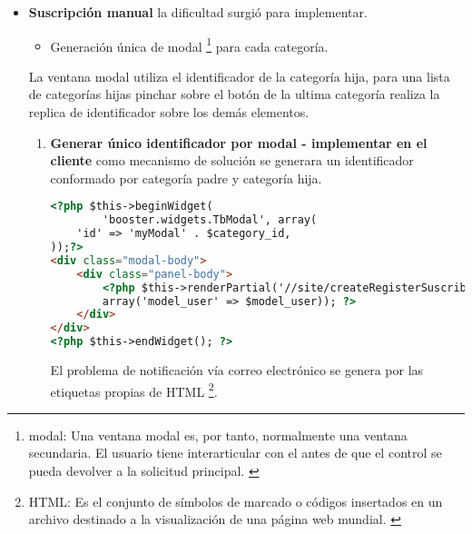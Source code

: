 \begin{itemize}

\item \textbf{Suscripción manual} la dificultad surgió para implementar.

\begin{itemize}

\item Generación única de modal \footnote{modal: Una ventana modal es,
por tanto, normalmente una ventana secundaria. El usuario tiene interarticular
con el antes de que el control se pueda devolver a la solicitud principal.
\cite{modal}} para cada categoría.

\end{itemize}

La ventana modal utiliza el identificador de la categoría hija, para una lista
de categorías hijas pinchar sobre el botón de la ultima categoría realiza la
replica de identificador sobre los demás elementos.

\begin{enumerate}

\item \textbf{Generar único identificador por modal - implementar en el cliente}
como mecanismo de solución se generara un identificador conformado por
categoría padre y categoría hija.

\begin{lstlisting}[language=HTML, caption={Generador ventana modal.}]
<?php $this->beginWidget(
        'booster.widgets.TbModal', array(
    'id' => 'myModal' . $category_id,
));?>
<div class="modal-body">
    <div class="panel-body">
        <?php $this->renderPartial('//site/createRegisterSuscribe', 
        array('model_user' => $model_user)); ?>
    </div>
</div>
<?php $this->endWidget(); ?>
\end{lstlisting}

El problema de notificación vía correo electrónico se genera por las etiquetas
propias de HTML \footnote{HTML: Es el conjunto de símbolos de marcado o
códigos insertados en un archivo destinado a la visualización de una página
web mundial. \cite{html}}.

\end{enumerate}

\end{itemize}